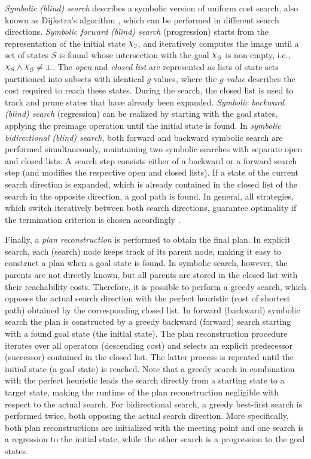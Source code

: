 \emph{Symbolic (blind) search} describes a symbolic version of uniform cost search, also known as Dijkstra's algorithm \autocite{dijkstra-nummath1959}, which can be performed in different search directions.
\emph{Symbolic forward (blind) search} (progression) starts from the representation of the initial state $\charf_\init$, and iteratively computes the image until a set of states $S$ is found whose intersection with the goal $\charf_\goal$ is non-empty, i.e., $\charf_S \land \charf_\goal \neq \bot$.
The \emph{open} and \emph{closed list} are represented as lists of state sets partitioned into subsets with identical $g$-values, where the \emph{$g$-value} describes the cost required to reach these states.
During the search, the closed list is used to track and prune states that have already been expanded.
\emph{Symbolic backward (blind) search} (regression) can be realized by starting with the goal states, applying the preimage operation until the initial state is found.
In \emph{symbolic bidirectional (blind) search}, both forward and backward symbolic search are performed simultaneously, maintaining two symbolic searches with separate open and closed lists. A search step consists either of a backward or a forward search step (and modifies the respective open and closed lists).  If a state of the current search direction is expanded, which is already contained in the closed list of the search in the opposite direction, a goal path is found.
In general, all strategies, which switch iteratively between both search
directions, guarantee optimality if the termination criterion is chosen accordingly \autocite{pohl-tr1969}.

Finally, a \emph{plan reconstruction} \autocite{torralba-phd2015} is performed to obtain the final plan.
In explicit search, each (search) node keeps track of its parent node, making it easy to construct a plan when a goal state is found.
In symbolic search, however, the parents are not directly known, but all parents are stored in the
closed list with their reachability costs. 
Therefore, it is possible to perform a greedy search, which opposes the actual search direction with the perfect heuristic (cost of shortest path) obtained by the corresponding closed list.
In forward (backward) symbolic search the plan is constructed by a greedy backward (forward) search starting with a found goal state (the initial state). The plan reconstruction procedure iterates over all operators (descending cost)
and selects an explicit predecessor (successor) contained in the closed
list. The latter process is repeated until the initial state (a goal state) is
reached. 
Note that a greedy search in combination with the perfect heuristic leads the search directly from a starting state to a target state, making the runtime of the plan reconstruction negligible with respect to the actual search.
For bidirectional search, a greedy best-first search is performed twice, both opposing the actual search direction. More specifically, both plan reconstructions are initialized with the meeting point and one search is a regression to the initial state, while the other search is a progression to the goal states.

